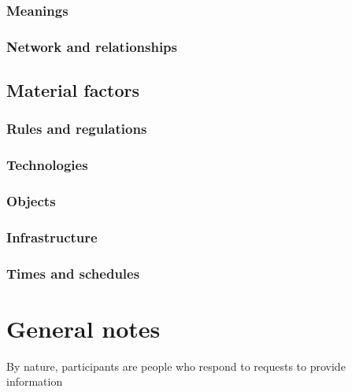 \subsubsection{Meanings}\label{sec:resmeanings}
\subsubsection{Network and relationships}\label{sec:resnetwork}
\subsection{Material factors}\label{sec:resmaterial}
\subsubsection{Rules and regulations}\label{sec:resrules}
\subsubsection{Technologies}\label{sec:restechnologies}
\subsubsection{Objects}\label{sec:resobjects}
\subsubsection{Infrastructure}\label{sec:resinfrastructure}
\subsubsection{Times and schedules}\label{sec:restimes}

\section{General notes}
By nature, participants are people who respond to requests to provide information


%
